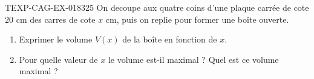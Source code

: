 \begin{exercice}{TEXP-CAG-EX-018}{3}{25}
On decoupe aux quatre coins d'une plaque carrée de cote $20$ cm des carres de cote $x$ cm, puis on replie pour former une boîte ouverte.
\begin{enumerate}
  \item Exprimer le volume $V(x)$ de la boîte en fonction de $x$.
  \item Pour quelle valeur de $x$ le volume est-il maximal ? Quel est ce volume maximal ?
\end{enumerate}

\end{exercice}
